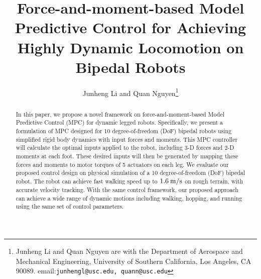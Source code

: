 \documentclass[letterpaper, 10 pt, conference]{ieeeconf}
\renewcommand{\unit}[1]{{\rm #1} }
\begin{document}
 

\title{\Large \bf 			
Force-and-moment-based Model Predictive Control for Achieving Highly Dynamic Locomotion on Bipedal Robots
}
	

\author{Junheng Li and Quan Nguyen\thanks{Junheng Li and Quan Nguyen are with the Department of Aerospace and Mechanical Engineering, University of Southern California, Los Angeles, CA 90089.
email:{\tt\small junhengl@usc.edu, quann@usc.edu}}%
}%
	
\maketitle

\begin{abstract}

In this paper, we propose a novel framework on force-and-moment-based Model Predictive Control (MPC) for dynamic legged robots. Specifically, we present a formulation of MPC designed for 10 degree-of-freedom (DoF) bipedal robots using simplified rigid body dynamics with input forces and moments. This MPC controller will calculate the optimal inputs applied to the robot, including 3-D forces and 2-D moments at each foot. These desired inputs will then be generated by mapping these forces and moments to motor torques of 5 actuators on each leg. We evaluate our proposed control design on physical simulation of a 10 degree-of-freedom (DoF) bipedal robot. The robot can achieve fast walking speed up to $ 1.6\:\unit{m/s}$ on rough terrain, with accurate velocity tracking. With the same control framework, our proposed approach can achieve a wide range of dynamic motions including walking, hopping, and running using the same set of control parameters.

\end{abstract}








\balance



\end{document}
